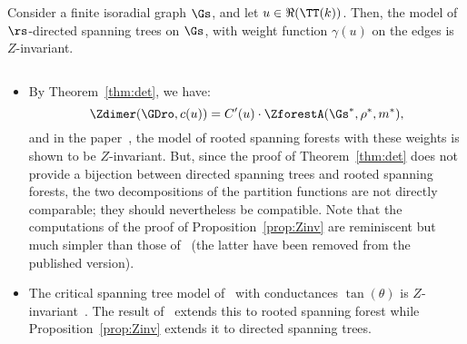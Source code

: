 \documentclass[a4paper,twoside,11pt]{article}
\begin{document}
\begin{prop}\label{prop:Zinv}
Consider a finite isoradial graph $\Gs$, and let $u\in\Re(\TT(k))$. Then, the model of $\rs$-directed spanning trees on $\Gs$, with weight function $\gamma(u)$ on the 
edges is $Z$-invariant.
\end{prop}
\begin{rem}$\;$
\begin{itemize}
\item By Theorem~\ref{thm:det}, we have:
\begin{equation*}
\Zdimer(\GDro,c(u))=C'(u)\cdot \ZforestA(\Gs^*,\rho^*,m^*),
\end{equation*}
and in the paper~\cite{BdTR1}, the model of rooted spanning forests with these weights
is shown to be $Z$-invariant. But, since the proof of Theorem~\ref{thm:det}
does not provide a bijection between directed spanning trees and rooted spanning forests, 
the two decompositions of the partition functions are not directly comparable; they should nevertheless be 
compatible. Note that the computations of the proof of Proposition~\ref{prop:Zinv} are reminiscent but
much simpler than those of~\cite{BdTR1} (the latter have been removed from the published version).
\item The critical spanning tree model of~\cite{Kenyon3} with conductances $\tan(\theta)$ is
$Z$-invariant~\cite{Kennelly}. The result of~\cite{BdTR1} extends this to rooted spanning forest while Proposition~\ref{prop:Zinv} 
extends it to directed spanning trees.
\end{itemize}
\end{rem}
\end{document}
